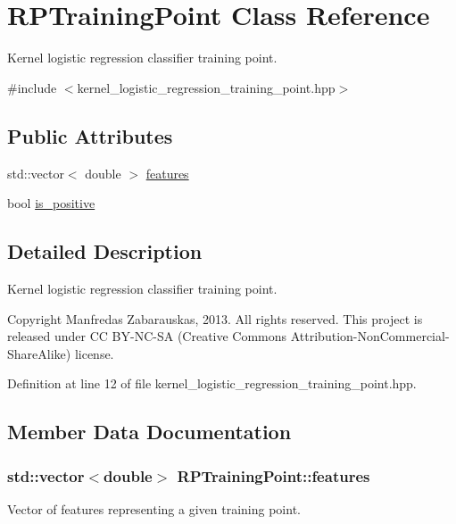 \hypertarget{struct_r_p_training_point}{\section{\-R\-P\-Training\-Point \-Class \-Reference}
\label{struct_r_p_training_point}
}


\-Kernel logistic regression classifier training point.  




{\ttfamily \#include $<$kernel\-\_\-logistic\-\_\-regression\-\_\-training\-\_\-point.\-hpp$>$}

\subsection*{\-Public \-Attributes}
\begin{DoxyCompactItemize}
\item 
std\-::vector$<$ double $>$ \hyperlink{struct_r_p_training_point_a57e71821e614dab549da45a2906548de}{features}
\item 
bool \hyperlink{struct_r_p_training_point_a1d5421e9f66fc7ffb85e580b2b019eb8}{is\-\_\-positive}
\end{DoxyCompactItemize}


\subsection{\-Detailed \-Description}
\-Kernel logistic regression classifier training point. 

\begin{DoxyCopyright}{\-Copyright}
\-Manfredas \-Zabarauskas, 2013. \-All rights reserved. \-This project is released under \-C\-C \-B\-Y-\/\-N\-C-\/\-S\-A (\-Creative \-Commons \-Attribution-\/\-Non\-Commercial-\/\-Share\-Alike) license. 
\end{DoxyCopyright}


\-Definition at line 12 of file kernel\-\_\-logistic\-\_\-regression\-\_\-training\-\_\-point.\-hpp.



\subsection{\-Member \-Data \-Documentation}
\hypertarget{struct_r_p_training_point_a57e71821e614dab549da45a2906548de}{
\subsubsection[{features}]{\setlength{\rightskip}{0pt plus 5cm}std\-::vector$<$double$>$ {\bf \-R\-P\-Training\-Point\-::features}}}\label{struct_r_p_training_point_a57e71821e614dab549da45a2906548de}
\-Vector of features representing a given training point. 


